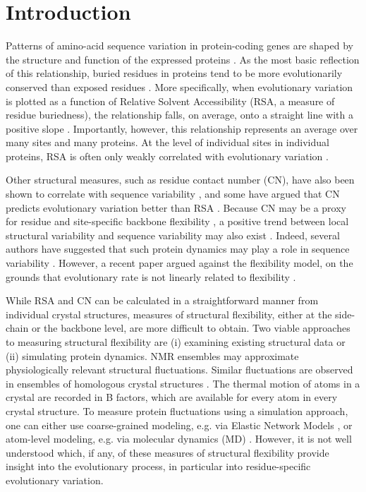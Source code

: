\documentclass[smallextended]{svjour3}
\begin{document}
\section*{Introduction}

Patterns of amino-acid sequence variation in protein-coding genes are shaped by the structure and function of the expressed proteins
\citep{WilkeDrummond2010,Liberlesetal2012,MarshTeichmann2014}. As the most basic reflection of this relationship, buried residues in proteins tend to be more evolutionarily conserved than exposed residues
\citep{Overingtonetal1992,Goldmanetal1998,MirnyShakhnovich1999,Deanetal2002}. More specifically, when evolutionary variation is plotted as a function of Relative Solvent Accessibility (RSA, a measure of residue buriedness), the relationship falls, on average, onto a straight line with a positive slope \citep{FranzosaXia2009,Ramseyetal2011,FranzosaXia2012,Scherreretal2012}. Importantly, however, this relationship represents an average over many sites and many proteins. At the level of individual sites in individual proteins, RSA is often only weakly correlated with evolutionary variation \citep{MeyerWilke2013,Meyeretal2013,Yehetal2014}.

Other structural measures, such as residue contact number (CN), have also been shown to correlate with sequence variability \citep{Liaoetal2005,FranzosaXia2009,Yehetal2014}, and some have argued that CN predicts evolutionary variation better than RSA \citep{Yehetal2014,Yehetal2014b}. Because CN may be a proxy for residue and site-specific backbone flexibility \citep{Halle2002}, a positive trend between local structural variability and sequence variability may also exist \citep{Yehetal2014}. Indeed, several authors have suggested that such protein dynamics may play a role in sequence variability \citep{LiuBahar2012,NevinGereketal2013,MarshTeichmann2014}. However, a recent paper argued against the flexibility model, on the grounds that evolutionary rate is not linearly related to flexibility \citep{Huangetal2014}.

While RSA and CN can be calculated in a straightforward manner from individual crystal structures, measures of structural flexibility, either at the side-chain or the backbone level, are more difficult to obtain. Two viable approaches to measuring structural flexibility are (i) examining existing structural data or (ii) simulating protein dynamics. NMR ensembles may approximate physiologically relevant structural fluctuations. Similar fluctuations are observed in ensembles of homologous crystal structures \citep{Maguidaetal2008,EchaveFernandez2010}. The thermal motion of atoms in a crystal are recorded in B factors, which are available for every atom in every crystal structure. To measure protein fluctuations using a simulation approach, one can either use coarse-grained modeling, e.g. via Elastic Network Models \citep{Sanejouand2013}, or atom-level modeling, e.g. via molecular dynamics (MD) \citep{KarplusMcCammon2002}. However, it is not well understood which, if any, of these measures of structural flexibility provide insight into the evolutionary process, in particular into residue-specific evolutionary variation.
\end{document}
